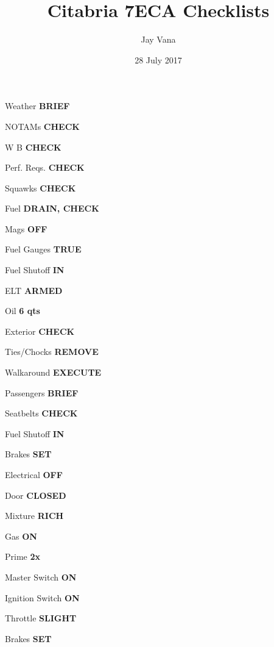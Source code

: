 \documentclass[8pt]{article}
\title{Citabria 7ECA Checklists}
\author{Jay Vana}
\date{28 July 2017}
\begin{document}

\def\arraystretch{1.3}
\begin{multicols*}{3}


\colorbox{green!80!red}{}

Weather \dotfill \textbf{BRIEF}

NOTAMs \dotfill \textbf{CHECK}

W B \dotfill \textbf{CHECK}

Perf. Reqs. \dotfill \textbf{CHECK}

Squawks \dotfill \textbf{CHECK}

\colorbox{green!80!red}{}

Fuel \dotfill \textbf{DRAIN, CHECK}

Mags \dotfill \textbf{OFF}

Fuel Gauges \dotfill \textbf{TRUE}

Fuel Shutoff \dotfill \textbf{IN}

ELT \dotfill \textbf{ARMED}

Oil \dotfill \textbf{6 qts}

Exterior \dotfill \textbf{CHECK}

Ties/Chocks \dotfill \textbf{REMOVE}

Walkaround \dotfill \textbf{EXECUTE}

\colorbox{green!80!red}{}

Passengers \dotfill \textbf{BRIEF}

Seatbelts \dotfill \textbf{CHECK}

Fuel Shutoff \dotfill \textbf{IN}

Brakes \dotfill \textbf{SET}

Electrical \dotfill \textbf{OFF}

Door \dotfill \textbf{CLOSED}

Mixture \dotfill \textbf{RICH}

Gas \dotfill \textbf{ON}

\colorbox{orange!80}{}

Prime \dotfill \textbf{2x}

Master Switch \dotfill \textbf{ON}

Ignition Switch \dotfill \textbf{ON}

Throttle \dotfill \textbf{SLIGHT}

Brakes \dotfill \textbf{SET}


\end{multicols*}
\end{document}
